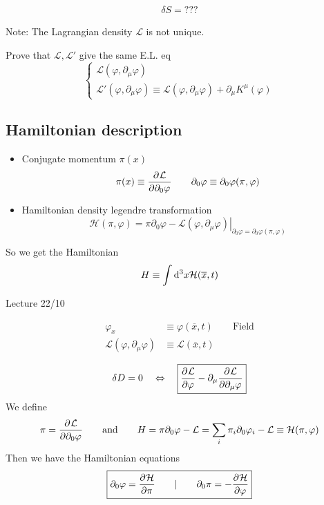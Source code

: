 \begin{align*}
\delta S = ???
\end{align*}

Note: The Lagrangian density $\mathcal{L}$ is not unique.

\begin{example}
Prove that $\mathcal{L}, \mathcal{L}'$ give the same E.L. eq
\[ \begin{cases}
\mathcal{L}(\varphi, \partial_\mu \varphi) \\
\mathcal{L}'(\varphi, \partial_\mu \varphi) \equiv \mathcal{L}(\varphi, \partial_\mu \varphi) + \partial_\mu K^\mu(\varphi)
\end{cases} \]
\end{example}

\subsection{Hamiltonian description}
\begin{itemize}
\item Conjugate momentum $\pi(x)$
\[ \pi(x) \equiv  \frac{\partial{^{}}\mathcal{L}}{\partial{{\partial_0\varphi}^{}}}  \qquad \partial_0\varphi \equiv \partial_0\varphi(\pi,\varphi) \]
\item Hamiltonian density legendre transformation
\[ \mathcal{H}(\pi, \varphi) = \left.\pi\partial_0\varphi - \mathcal{L}(\varphi, \partial_\mu\varphi)\right|_{\partial_0\varphi = \partial_0\varphi(\pi, \varphi)} \]
\end{itemize}
So we get the Hamiltonian
\[ H \equiv \int \operatorname{d \!}{^3x}\mathcal{H}(\overline{x},t) \]

Lecture 22/10

\begin{align*}
\varphi_x &\equiv \varphi(\overline{x},t) \qquad \text{Field}\\
\mathcal{L}(\varphi, \partial_\mu\varphi) &\equiv \mathcal{L}(\overline{x},t)
\end{align*}

\[ \delta D = 0 \quad \Leftrightarrow \quad \boxed{ \frac{\partial{^{}}\mathcal{L}}{\partial{{\varphi}^{}}} -\partial_\mu  \frac{\partial{^{}}\mathcal{L}}{\partial{{\partial_\mu\varphi}^{}}} } \]
We define \[ \pi =  \frac{\partial{^{}}\mathcal{L}}{\partial{{\partial_0\varphi}^{}}}  \qquad \text{and} \qquad H = \pi\partial_0\varphi - \mathcal{L} = \sum_i\pi_i\partial_0\varphi_i - \mathcal{L} \equiv \mathcal{H}(\pi,\varphi) \]
Then we have the Hamiltonian equations
\[ \boxed{ \partial_0\varphi =  \frac{\partial{^{}}\mathcal{H}}{\partial{{\pi}^{}}}  \qquad | \qquad \partial_0\pi = -  \frac{\partial{^{}}\mathcal{H}}{\partial{{\varphi}^{}}}  } \]

